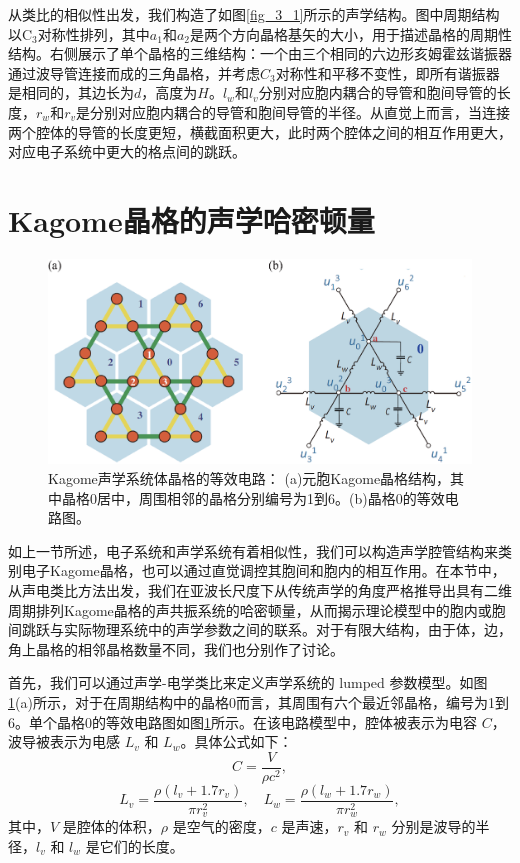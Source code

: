 从类比的相似性出发，我们构造了如图\ref{fig_3_1}所示的声学结构。图中周期结构以C$_{3}$对称性排列，其中$a_1$和$a_2$是两个方向晶格基矢的大小，用于描述晶格的周期性结构。右侧展示了单个晶格的三维结构：一个由三个相同的六边形亥姆霍兹谐振器通过波导管连接而成的三角晶格，并考虑$C_3$对称性和平移不变性，即所有谐振器是相同的，其边长为$d$，高度为$H$。$l_w$和$l_v$分别对应胞内耦合的导管和胞间导管的长度，$r_w$和$r_v$是分别对应胞内耦合的导管和胞间导管的半径。从直觉上而言，当连接两个腔体的导管的长度更短，横截面积更大，此时两个腔体之间的相互作用更大，对应电子系统中更大的格点间的跳跃\cite{j4,h8}。

\section{Kagome晶格的声学哈密顿量}

\begin{figure}[h!]
  \centering
  \includegraphics[width=1\textwidth]{images/fig3-2.eps} 
  \caption{Kagome声学系统体晶格的等效电路：
  (a)元胞Kagome晶格结构，其中晶格0居中，周围相邻的晶格分别编号为1到6。(b)晶格0的等效电路图。
  }
  \label{fig_3_2}
\end{figure}

如上一节所述，电子系统和声学系统有着相似性，我们可以构造声学腔管结构来类别电子Kagome晶格，也可以通过直觉调控其胞间和胞内的相互作用。在本节中，从声电类比方法出发，我们在亚波长尺度下从传统声学的角度严格推导出具有二维周期排列Kagome晶格的声共振系统的哈密顿量，从而揭示理论模型中的胞内或胞间跳跃与实际物理系统中的声学参数之间的联系。对于有限大结构，由于体，边，角上晶格的相邻晶格数量不同，我们也分别作了讨论。

首先，我们可以通过声学-电学类比来定义声学系统的 lumped 参数模型。如图\ref{fig_3_2}(a)所示，对于在周期结构中的晶格0而言，其周围有六个最近邻晶格，编号为1到6。单个晶格0的等效电路图如图\ref{fig_3_2}所示。在该电路模型中，腔体被表示为电容 \( C \)，波导被表示为电感 \( L_v \) 和 \( L_w \)。具体公式如下：
\begin{equation} \label{eq3-1}
  C = \frac{V}{\rho c^2},
\end{equation}
\begin{equation} \label{eq3-2}
  L_v = \frac{\rho (l_v + 1.7r_v)}{\pi r_v^2}, \quad L_w = \frac{\rho (l_w + 1.7r_w)}{\pi r_w^2},
\end{equation}
其中，\( V \) 是腔体的体积，\( \rho \) 是空气的密度，\( c \) 是声速，\( r_v \) 和 \( r_w \) 分别是波导的半径，\( l_v \) 和 \( l_w \) 是它们的长度。

